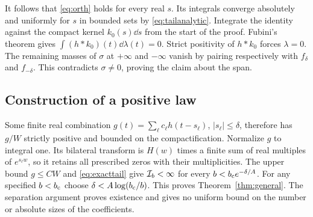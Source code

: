 It follows that \eqref{eq:orth} holds for every real $s$. Its integrals converge absolutely and uniformly for $s$ in bounded sets by \eqref{eq:tailanalytic}. Integrate the identity against the compact kernel $k_0(s)\dd s$ from the start of the proof. Fubini's theorem gives $\int(h*k_0)(t)\dd\lambda(t)=0$. Strict positivity of $h*k_0$ forces $\lambda=0$. The remaining masses of $\sigma$ at $+\infty$ and $-\infty$ vanish by pairing respectively with $f_\delta$ and $f_{-\delta}$. This contradicts $\sigma\ne0$, proving the claim about the span.

\subsection*{Construction of a positive law}
Some finite real combination $g(t)=\sum_\ell c_\ell h(t-s_\ell)$, $|s_\ell|\le\delta$, therefore has $g/W$ strictly positive and bounded on the compactification. Normalize $g$ to integral one. Its bilateral transform is $H(w)$ times a finite sum of real multiples of $e^{s_\ell w}$, so it retains all prescribed zeros with their multiplicities. The upper bound $g\le C W$ and \eqref{eq:exacttail} give $\mathcal I_b<\infty$ for every $b<b_{\mathrm c} e^{-\delta/A}$. For any specified $b<b_{\mathrm c}$ choose $\delta<A\log(b_{\mathrm c}/b)$. This proves Theorem~\ref{thm:general}. The separation argument proves existence and gives no uniform bound on the number or absolute sizes of the coefficients.
